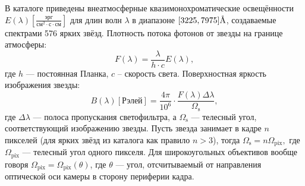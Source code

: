 \documentclass[12pt,a4paper]{article}
\newcommand{\angstrom}{\textup{\AA}}
\begin{document}
В каталоге \cite{Kharitonov1978} приведены внеатмосферные квазимонохроматические освещённости $E(\lambda) [\frac{\text{эрг}}{\text{см}^2 \cdot \text{с} \cdot \text{см}}]$ для длин волн $\lambda$ в диапазоне $[3225,7975]\angstrom$, создаваемые спектрами 576 ярких звёзд. Плотность потока фотонов от звезды на границе атмосферы:
\begin{equation}\label{eq:eq9}
F(\lambda)=\frac{\lambda}{h \cdot c} E(\lambda),
\end{equation}
где $h$ --- постоянная Планка, $c$ -- скорость света. Поверхностная яркость изображения звезды:
\begin{equation}\label{eq:eq10}
B(\lambda) [\text{Рэлей}] = \frac {4\pi}{10^6} \cdot \frac{F(\lambda) \Delta \lambda} {\Omega_\text{s}},
\end{equation}
где $\Delta \lambda$ --- полоса пропускания светофильтра, а $\Omega_\text{s}$ --- телесный угол, соответствующий изображению звезды. Пусть звезда занимает в кадре $n$ пикселей (для ярких звёзд из каталога \cite{Kharitonov1978} как правило $n>3$), тогда $\Omega_\text{s}=n\Omega_{\text{pix}},$ где $\Omega_{\text{pix}}$ --- телесный угол одного пикселя. Для широкоугольных объективов вообще говоря $\Omega_{\text{pix}}=\Omega_{\text{pix}}(\theta)$, где $\theta$ --- угол, отсчитываемый от направления оптической оси камеры в сторону периферии кадра. 
\end{document}
